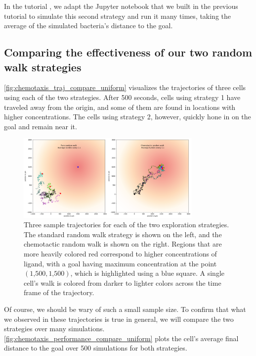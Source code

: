 In the tutorial , we adapt the Jupyter notebook that we built in the previous tutorial to simulate this second strategy and run it many times, taking the average of the simulated bacteria's distance to the goal.

\FloatBarrier
{}
\subsection{Comparing the effectiveness of our two random walk strategies}

\autoref{fig:chemotaxis_traj_compare_uniform} visualizes the trajectories of three cells using each of the two strategies. After 500 seconds, cells using strategy 1 have traveled away from the origin, and some of them are found in locations with higher concentrations. The cells using strategy 2, however, quickly hone in on the goal and remain near it.

\begin{figure}[h]
\centering
\mySfFamily
\includegraphics[width = 0.8\textwidth]{../images/chemotaxis_traj_compare_uniform.png}
\caption{Three sample trajectories for each of the two exploration strategies. The standard random walk strategy is shown on the left, and the chemotactic random walk is shown on the right. Regions that are more heavily colored red correspond to higher concentrations of ligand, with a goal having maximum concentration at the point $(\text{1,500}, \text{1,500})$, which is highlighted using a blue square. A single cell's walk is colored from darker to lighter colors across the time frame of the trajectory.}
\label{fig:chemotaxis_traj_compare_uniform}
\end{figure}


Of course, we should be wary of such a small sample size. To confirm that what we observed in these trajectories is true in general, we will compare the two strategies over many simulations. \autoref{fig:chemotaxis_performance_compare_uniform} plots the cell's average final distance to the goal over 500 simulations for both strategies.

